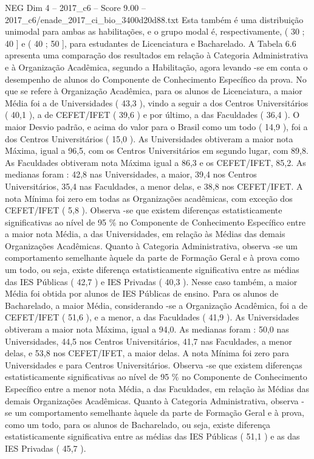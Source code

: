 \begin{textsample}{NEG Dim 4 – 2017\_c6 – Score 9.00 – 2017\_c6/enade\_2017\_ci\_bio\_3400d20d88.txt}
Esta também é uma distribuição unimodal para ambas as habilitações, e o grupo modal é, respectivamente, ( 30 ; 40 ] e ( 40 ; 50 ], para estudantes de Licenciatura e Bacharelado.
A Tabela 6.6 apresenta uma comparação dos resultados em relação à Categoria Administrativa e à Organização Acadêmica, segundo a Habilitação, agora levando -se em conta o desempenho de alunos do Componente de Conhecimento Específico da prova.
No que se refere à Organização Acadêmica, para os alunos de Licenciatura, a maior Média foi a de Universidades ( 43,3 ), vindo a seguir a dos Centros Universitários ( 40,1 ), a de CEFET/IFET ( 39,6 ) e por último, a das Faculdades ( 36,4 ).
O maior Desvio padrão, e acima do valor para o Brasil como um todo ( 14,9 ), foi a dos Centros Universitários ( 15,0 ).
As Universidades obtiveram a maior nota Máxima, igual a 96,5, com os Centros Universitários em segundo lugar, com 89,8.
As Faculdades obtiveram nota Máxima igual a 86,3 e os CEFET/IFET, 85,2.
As medianas foram : 42,8 nas Universidades, a maior, 39,4 nos Centros Universitários, 35,4 nas Faculdades, a menor delas, e 38,8 nos CEFET/IFET.
A nota Mínima foi zero em todas as Organizações acadêmicas, com exceção dos CEFET/IFET ( 5,8 ).
Observa -se que existem diferenças estatisticamente significativas ao nível de 95 \% no Componente de Conhecimento Específico entre a maior nota Média, a das Universidades, em relação às Médias das demais Organizações Acadêmicas.
Quanto à Categoria Administrativa, observa -se um comportamento semelhante àquele da parte de Formação Geral e à prova como um todo, ou seja, existe diferença estatisticamente significativa entre as médias das IES Públicas ( 42,7 ) e IES Privadas ( 40,3 ).
Nesse caso também, a maior Média foi obtida por alunos de IES Públicas de ensino.
Para os alunos de Bacharelado, a maior Média, considerando -se a Organização Acadêmica, foi a de CEFET/IFET ( 51,6 ), e a menor, a das Faculdades ( 41,9 ).
As Universidades obtiveram a maior nota Máxima, igual a 94,0.
As medianas foram : 50,0 nas Universidades, 44,5 nos Centros Universitários, 41,7 nas Faculdades, a menor delas, e 53,8 nos CEFET/IFET, a maior delas.
A nota Mínima foi zero para Universidades e para Centros Universitários.
Observa -se que existem diferenças estatisticamente significativas ao nível de 95 \% no Componente de Conhecimento Específico entre a menor nota Média, a das Faculdades, em relação às Médias das demais Organizações Acadêmicas.
Quanto à Categoria Administrativa, observa -se um comportamento semelhante àquele da parte de Formação Geral e à prova, como um todo, para os alunos de Bacharelado, ou seja, existe diferença estatisticamente significativa entre as médias das IES Públicas ( 51,1 ) e as das IES Privadas ( 45,7 ).

\end{textsample}
